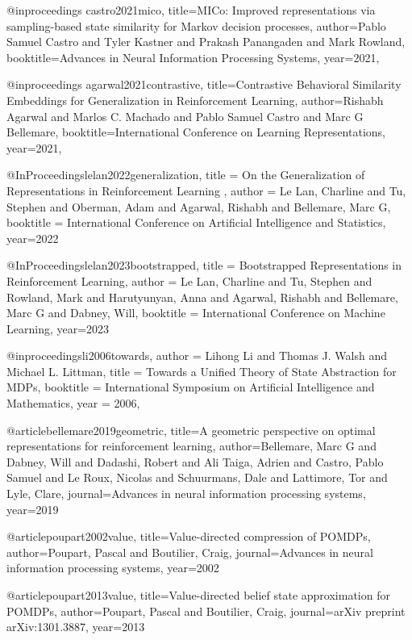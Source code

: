 @inproceedings{
castro2021mico,
title={{MIC}o: Improved representations via sampling-based state similarity for Markov decision processes},
author={Pablo Samuel Castro and Tyler Kastner and Prakash Panangaden and Mark Rowland},
booktitle={Advances in Neural Information Processing Systems},
year={2021},
}

@inproceedings{
agarwal2021contrastive,
title={Contrastive Behavioral Similarity Embeddings for Generalization in Reinforcement Learning},
author={Rishabh Agarwal and Marlos C. Machado and Pablo Samuel Castro and Marc G Bellemare},
booktitle={International Conference on Learning Representations},
year={2021},
}


@InProceedings{lelan2022generalization,
  title = 	 { On the Generalization of Representations in Reinforcement Learning },
  author =       {Le Lan, Charline and Tu, Stephen and Oberman, Adam and Agarwal, Rishabh and Bellemare, Marc G},
  booktitle = 	 {International Conference on Artificial Intelligence and Statistics},
  year={2022}
}

@InProceedings{lelan2023bootstrapped,
  title = 	 {Bootstrapped Representations in Reinforcement Learning},
  author = {Le Lan, Charline and Tu, Stephen and Rowland, Mark and Harutyunyan, Anna and Agarwal, Rishabh and Bellemare, Marc G and Dabney, Will},
  booktitle = 	 {International Conference on Machine Learning},
  year={2023}
}

@inproceedings{li2006towards,
  author       = {Lihong Li and
                  Thomas J. Walsh and
                  Michael L. Littman},
  title        = {Towards a Unified Theory of State Abstraction for MDPs},
  booktitle    = {International Symposium on Artificial Intelligence and Mathematics},
  year         = {2006},
}


@article{bellemare2019geometric,
  title={A geometric perspective on optimal representations for reinforcement learning},
  author={Bellemare, Marc G and Dabney, Will and Dadashi, Robert and Ali Taiga, Adrien and Castro, Pablo Samuel and Le Roux, Nicolas and Schuurmans, Dale and Lattimore, Tor and Lyle, Clare},
  journal={Advances in neural information processing systems},
  year={2019}
}

@article{poupart2002value,
  title={Value-directed compression of POMDPs},
  author={Poupart, Pascal and Boutilier, Craig},
  journal={Advances in neural information processing systems},
  year={2002}
}

@article{poupart2013value,
  title={Value-directed belief state approximation for POMDPs},
  author={Poupart, Pascal and Boutilier, Craig},
  journal={arXiv preprint arXiv:1301.3887},
  year={2013}
}


